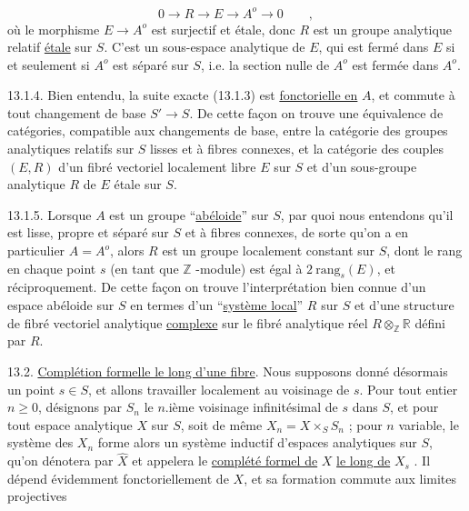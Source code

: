 \begin{equation}\tag{13.1.3}
0 \longrightarrow R \longrightarrow E \longrightarrow A^{o} \longrightarrow 0 \qquad ,
\end{equation}
où le morphisme $E \longrightarrow A^{o}$ est surjectif et étale, donc $R$ est un groupe analytique relatif \underline{étale} sur $S$. C'est un sous-espace analytique de $E$, qui est fermé dans $E$ si et seulement si $A^{o}$ est séparé sur $S$, i.e. la section nulle de $A^{o}$ est fermée dans $A^{o}$.



13.1.4. Bien entendu, la suite exacte (13.1.3) est \underline{fonctorielle en} $A$, et commute à tout changement de base $S' \longrightarrow S$. De cette façon on trouve une équivalence de catégories, compatible aux changements de base, entre la catégorie des groupes analytiques relatifs sur $S$ lisses et à fibres connexes, et la catégorie des couples $(E,R)$ d'un fibré vectoriel localement libre $E$ sur $S$ et d'un sous-groupe analytique $R$ de $E$ étale sur $S$.

13.1.5. Lorsque $A$ est un groupe ``\underline{abéloide}'' sur $S$, par quoi nous entendons qu'il est lisse, propre et séparé sur $S$ et à fibres connexes, de sorte qu'on a en particulier $A=A^{o}$, alors $R$ est un groupe localement constant sur $S$, dont le rang en chaque point $s$ (en tant que $\mathbb{Z}$ -module) est égal à $2\ \mathrm{rang}_s(E)$, et réciproquement. De cette façon on trouve l'interprétation bien connue d'un espace abéloide sur $S$ en termes d'un ``\underline{système local}'' $R$ sur $S$ et d'une structure de fibré vectoriel analytique \underline{complexe} sur le fibré analytique réel $R \otimes_{\mathbb{Z}} \mathbb{R}$ défini par $R$.

13.2. \underline{Complétion formelle le long d'une fibre}. Nous supposons donné désormais un point $s \in S$, et allons travailler localement au voisinage de $s$. Pour tout entier $n \geq 0$, désignons par $S_n$ le $n$.ième voisinage infinitésimal de $s$ dans $S$, et pour tout espace analytique $X$ sur $S$, soit de même $X_n=X\times_S S_n$ ; pour $n$ variable, le système des $X_n$ forme alors un système inductif d'espaces analytiques sur $S$, qu'on dénotera par $\hat{X}$ et appelera le \underline{complété formel de} $X$ \underline{le long de} $X_s$ . Il dépend évidemment fonctoriellement de $X$, et sa formation commute aux limites projectives



